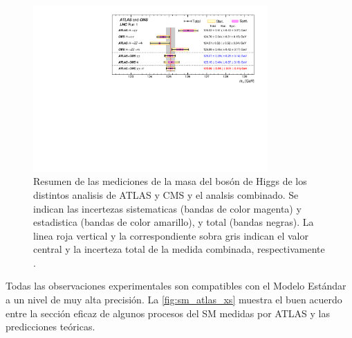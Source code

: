 \begin{figure}[!htbp]
  \centering
  \includegraphics[width=0.8\textwidth]{figures/higgs_atlas_cms_mass}
  \caption{Resumen de las mediciones de la masa del bosón de Higgs de los distintos
    analisis de ATLAS y CMS y el analsis combinado. Se indican las incertezas
    sistematicas (bandas de color magenta) y estadistica (bandas de color amarillo),
    y total (bandas negras). La linea roja vertical y la correspondiente sobra gris
    indican el valor central y la incerteza total de la medida combinada, respectivamente
    \cite{HiggsMass_ATLAS_CMS}.}
  \label{fig:higgs_cms_atlas}
\end{figure}



Todas las observaciones experimentales son compatibles con el Modelo Estándar a
un nivel de muy alta precisión. La \cref{fig:sm_atlas_xs} muestra el buen
acuerdo entre la sección eficaz de algunos procesos del SM medidas por
ATLAS y las predicciones teóricas.



